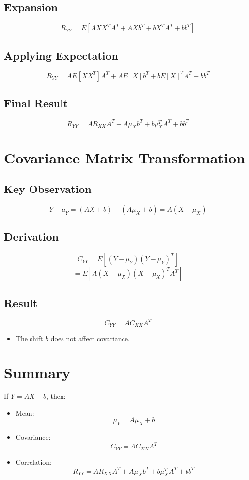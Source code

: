 \documentclass[11pt]{article}
\begin{document}
\subsection{Expansion}
\[
R_{YY} = E[AXX^T A^T + AXb^T + bX^T A^T + bb^T]
\]

\subsection{Applying Expectation}
\[
R_{YY} = A E[XX^T] A^T + A E[X] b^T + b E[X]^T A^T + bb^T
\]

\subsection{Final Result}
\[
R_{YY} = A R_{XX} A^T + A \mu_X b^T + b \mu_X^T A^T + bb^T
\]

\section{Covariance Matrix Transformation}

\subsection{Key Observation}
\[
Y - \mu_Y = (AX + b) - (A\mu_X + b) = A(X - \mu_X)
\]

\subsection{Derivation}
\[
C_{YY} = E[(Y - \mu_Y)(Y - \mu_Y)^T]
\]
\[
= E[A(X - \mu_X)(X - \mu_X)^T A^T]
\]

\subsection{Result}
\[
C_{YY} = A C_{XX} A^T
\]

\begin{itemize}
\item The shift $b$ does not affect covariance.
\end{itemize}

\section{Summary}

If $Y = AX + b$, then:

\begin{itemize}
\item Mean:
\[
\mu_Y = A\mu_X + b
\]

\item Covariance:
\[
C_{YY} = A C_{XX} A^T
\]

\item Correlation:
\[
R_{YY} = A R_{XX} A^T + A \mu_X b^T + b \mu_X^T A^T + bb^T
\]
\end{itemize}
\end{document}
